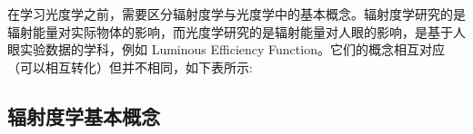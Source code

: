\documentclass[UTF8]{report}
\theoremstyle{MyLineTheoremStyle} %
\theoremstyle{MyBlockTheoremStyle} %
\theoremstyle{MySubsubsectionStyle} %
\begin{document}
在学习光度学之前，需要区分辐射度学与光度学中的基本概念。辐射度学研究的是辐射能量对实际物体的影响，而光度学研究的是辐射能量对人眼的影响，是基于人眼实验数据的学科，例如 Luminous Efficiency Function。它们的概念相互对应（可以相互转化）但并不相同，如下表所示: 
\begin{table}[H]\centering
    \caption{\textbf{光度学与辐射度学概念对应关系}}
    \label{光度学与辐射度学概念对应关系}
\end{table}



\subsection{辐射度学基本概念}
\end{document}
